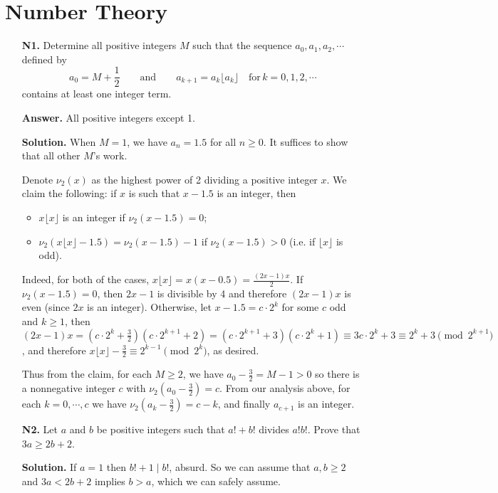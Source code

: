 \documentclass[11pt,a4paper]{article}
\begin{document}
\section*{Number Theory}
\begin{enumerate}
\item[\textbf{N1.}] Determine all positive integers $M$ such that the sequence $a_0, a_1, a_2, \cdots$ defined by \[ a_0 = M + \frac{1}{2} \qquad \textrm{and} \qquad a_{k+1} = a_k\lfloor a_k \rfloor \quad \textrm{for} \, k = 0, 1, 2, \cdots \]contains at least one integer term.

\textbf{Answer.} All positive integers except 1. 

\textbf{Solution.} 
When $M = 1$, we have $a_n = 1.5$ for all $n\ge 0$. It suffices to show that all other $M$'s work. 

Denote $\nu_2(x)$ as the highest power of 2 dividing a positive integer $x$. 
We claim the following: if $x$ is such that $x - 1.5$ is an integer, then 
\begin{itemize}
	\item $x\lfloor x\rfloor$ is an integer if $\nu_2(x - 1.5) = 0$; 
	
	\item $\nu_2(x\lfloor x\rfloor - 1.5) = \nu_2(x - 1.5) - 1$ if $\nu_2(x - 1.5) > 0$ (i.e. if $\lfloor x\rfloor$ is odd). 
\end{itemize}
Indeed, for both of the cases, $x\lfloor x\rfloor = x(x - 0.5) = \frac{(2x - 1)x}{2}$. 
If $\nu_2(x - 1.5) = 0$, then $2x - 1$ is divisible by 4 and therefore $(2x - 1)x$ is even (since $2x$ is an integer). 
Otherwise, let $x - 1.5 = c\cdot 2^k$ for some $c$ odd and $k\ge 1$, then $(2x - 1)x = (c\cdot 2^k + \frac 32)(c\cdot 2^{k + 1} + 2)
=(c\cdot 2^{k + 1} + 3)(c\cdot 2^{k } + 1)\equiv 3c\cdot 2^k + 3 \equiv 2^k+3\pmod{2^{k+1}}$, 
and therefore $x\lfloor x\rfloor - \frac 32 \equiv 2^{k-1}\pmod{2^k}$, as desired. 

Thus from the claim, for each $M\ge 2$, we have $a_0 - \frac 32 = M - 1 > 0$ so there is a nonnegative integer $c$ with $\nu_2(a_0 - \frac 32) = c$. 
From our analysis above, for each $k=0, \cdots, c$ we have $\nu_2(a_k - \frac 32) = c - k$, and finally $a_{c+1}$ is an integer. 

\item[\textbf{N2.}] Let $a$ and $b$ be positive integers such that $a! + b!$ divides $a!b!$. Prove that $3a \ge 2b + 2$.

\textbf{Solution.} If $a=1$ then $b!+1\mid b!$, absurd. So we can assume that $a,b\ge 2$ and $3a< 2b+2$ implies $b>a$, which we can safely assume.


\end{enumerate}
\end{document}
